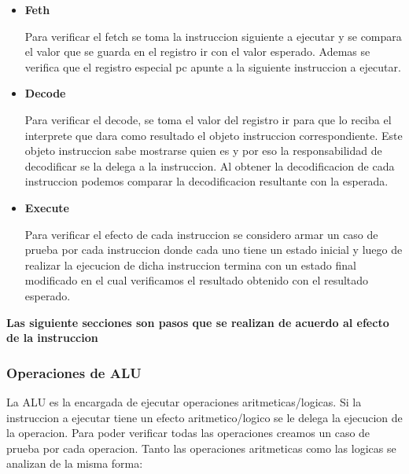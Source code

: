 \begin{itemize}
\item \textbf{Feth} 

Para verificar el fetch se toma la instruccion siguiente a ejecutar y se compara el valor que se guarda en el registro ir con el valor esperado. Ademas se verifica que el registro especial pc apunte a la siguiente instruccion a ejecutar.

\item \textbf{Decode}

Para verificar el decode, se toma el valor del registro ir para que lo reciba el interprete que dara como resultado el objeto instruccion correspondiente. Este objeto instruccion sabe mostrarse quien es y por eso la responsabilidad de decodificar se la delega a la instruccion. Al obtener la decodificacion de cada instruccion podemos comparar la decodificacion resultante con la esperada.
 
\item \textbf{Execute}

Para verificar el efecto de cada instruccion se considero armar un caso de prueba por cada instruccion donde cada uno tiene un estado inicial y luego de realizar la ejecucion de dicha instruccion termina con un estado final modificado en el cual verificamos el resultado obtenido con el resultado esperado. 
\end{itemize}

\textbf{Las siguiente secciones son pasos que se realizan de acuerdo al efecto de la instruccion}
  
\subsubsection{Operaciones de ALU}
La ALU es la encargada de ejecutar operaciones aritmeticas/logicas. Si la instruccion a ejecutar tiene un efecto aritmetico/logico se le delega la ejecucion de la operacion. Para poder verificar todas las operaciones creamos un caso de prueba por cada operacion. Tanto las operaciones aritmeticas como las logicas se analizan de la misma forma:

